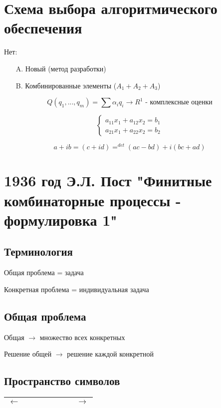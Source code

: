 \documentclass[a4paper, 14pt]{report}
\begin{document}
    \chapter{Схема выбора алгоритмического обеспечения}

    Нет:

    \begin{enumerate}
        \item[A.] Новый (метод разработки)
        \item[B.] Комбинированные элементы ($A_1 + A_2 + A_3$)
    \end{enumerate}

    $$ Q(q_1,...,q_m) = \sum \alpha_i q_i \to R^1 \text{ - комплексные оценки}$$

    $$
    \begin{cases}
        a_{11} x_1 + a_{12} x_2 = b_1 \\
        a_{21} x_1 + a_{22} x_2 = b_2
    \end{cases}
    $$

    $$ a + ib = (c + id) = ^{det} (ac - bd) + i (bc + ad) $$

    \chapter{1936 год Э.Л. Пост "Финитные комбинаторные процессы - формулировка 1"}

    \section{Терминология}

    Общая проблема = задача

    Конкретная проблема = индивидуальная задача

    \section{Общая проблема}

    Общая $\to$ множество всех конкретных

    Решение общей $\to$ решение каждой конкретной

    \section{Пространство символов}

    \begin{tabular}{c|c|c|c|c|c|c|c}
        \hline
        $\leftarrow$ & & & & & & & $\to$ \\
        \hline
    \end{tabular}
\end{document}
